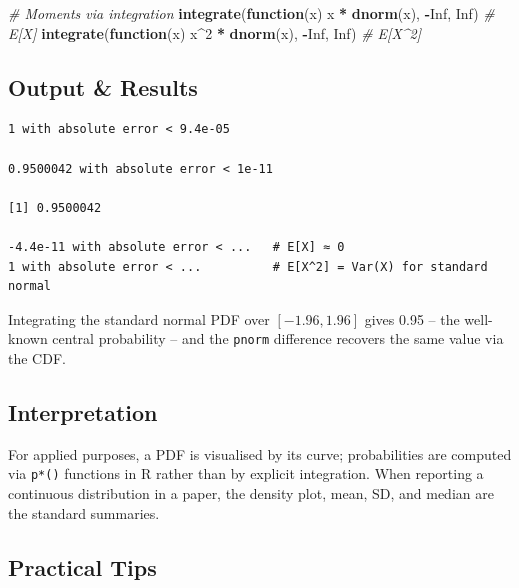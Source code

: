 \documentclass[
]{article}
\newenvironment{Shaded}{\begin{snugshade}}{\end{snugshade}}
\newcommand{\CommentTok}[1]{\textcolor[rgb]{0.56,0.35,0.01}{\textit{#1}}}
\newcommand{\ConstantTok}[1]{\textcolor[rgb]{0.56,0.35,0.01}{#1}}
\newcommand{\ControlFlowTok}[1]{\textcolor[rgb]{0.13,0.29,0.53}{\textbf{#1}}}
\newcommand{\DecValTok}[1]{\textcolor[rgb]{0.00,0.00,0.81}{#1}}
\newcommand{\FunctionTok}[1]{\textcolor[rgb]{0.13,0.29,0.53}{\textbf{#1}}}
\newcommand{\NormalTok}[1]{#1}
\newcommand{\SpecialCharTok}[1]{\textcolor[rgb]{0.81,0.36,0.00}{\textbf{#1}}}
\begin{document}
\begin{Shaded}
\begin{Highlighting}[]
\CommentTok{\# Moments via integration}
\FunctionTok{integrate}\NormalTok{(}\ControlFlowTok{function}\NormalTok{(x) x }\SpecialCharTok{*} \FunctionTok{dnorm}\NormalTok{(x), }\SpecialCharTok{{-}}\ConstantTok{Inf}\NormalTok{, }\ConstantTok{Inf}\NormalTok{)        }\CommentTok{\# E[X]}
\FunctionTok{integrate}\NormalTok{(}\ControlFlowTok{function}\NormalTok{(x) x}\SpecialCharTok{\^{}}\DecValTok{2} \SpecialCharTok{*} \FunctionTok{dnorm}\NormalTok{(x), }\SpecialCharTok{{-}}\ConstantTok{Inf}\NormalTok{, }\ConstantTok{Inf}\NormalTok{)      }\CommentTok{\# E[X\^{}2]}
\end{Highlighting}
\end{Shaded}

\subsection{Output \& Results}\label{output-results}

\begin{verbatim}
1 with absolute error < 9.4e-05

0.9500042 with absolute error < 1e-11

[1] 0.9500042

-4.4e-11 with absolute error < ...   # E[X] ≈ 0
1 with absolute error < ...          # E[X^2] = Var(X) for standard normal
\end{verbatim}

Integrating the standard normal PDF over \([-1.96, 1.96]\) gives 0.95 --
the well-known central probability -- and the \texttt{pnorm} difference
recovers the same value via the CDF.

\subsection{Interpretation}\label{interpretation}

For applied purposes, a PDF is visualised by its curve; probabilities
are computed via \texttt{p*()} functions in R rather than by explicit
integration. When reporting a continuous distribution in a paper, the
density plot, mean, SD, and median are the standard summaries.

\subsection{Practical Tips}\label{practical-tips}
\end{document}
